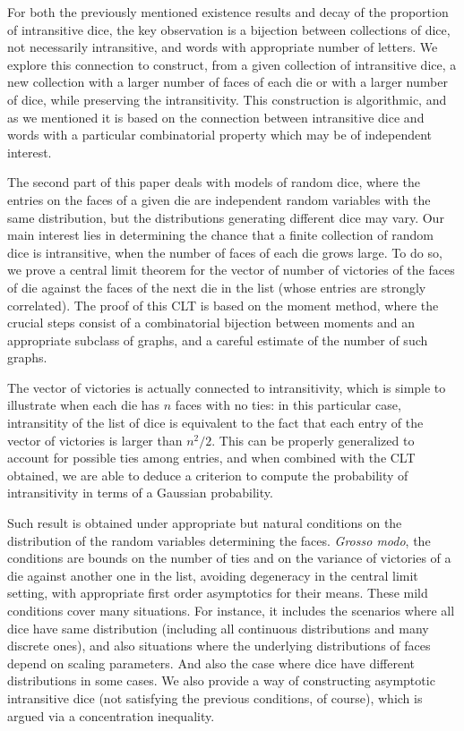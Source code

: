 \documentclass[reqno,a4paper,11pt]{amsart}
\theoremstyle{remark}
\numberwithin{equation}{section}
\begin{document}
For both the previously mentioned existence results and decay of the proportion of intransitive dice, the key observation is a bijection between collections of dice, not necessarily intransitive, and words with appropriate number of letters. We explore this connection to construct, from a given collection of intransitive dice, a new collection with a larger number of faces of each die or with a larger number of dice, while preserving the intransitivity. This construction is algorithmic, and as we mentioned it is based on the connection between intransitive dice and words with a particular combinatorial property which may be of independent interest.

The second part of this paper deals with models of random dice, where the entries on the faces of a given die are independent random variables with the same distribution, but the distributions generating different dice may vary. Our main interest lies in determining the chance that a finite collection of random dice is intransitive, when the number of faces of each die grows large. To do so, we prove a central limit theorem for the vector of number of victories of the faces of die against the faces of the next die in the list (whose entries are strongly correlated). The proof of this CLT  is based on the moment method, where the crucial steps consist of a combinatorial bijection between moments and an appropriate subclass of graphs, and a careful estimate of the number of such graphs. 

The vector of victories is actually connected to intransitivity, which is simple to illustrate when each die has $n$ faces with no ties: in this particular case, intransitity of the list of dice is  equivalent to the fact that each entry of the vector of victories is larger than $n^2/2$.
This can be properly generalized to account for possible ties among entries, and when combined with the CLT obtained, we are able to deduce a criterion to compute the probability of intransitivity in terms of a Gaussian probability.

Such result is obtained under appropriate but natural conditions on the distribution of the random variables determining the faces. \textit{Grosso modo}, the conditions are bounds on the number of ties and on the variance of victories of a die against another one in the list, avoiding degeneracy in the central limit setting, with appropriate first order asymptotics for their means.  These mild conditions cover many situations. For instance, it  includes the  scenarios where  all dice have same distribution (including all continuous distributions and many discrete ones), and also situations where the underlying distributions of faces depend on scaling parameters. And also the case where dice have different distributions in some cases. We also provide a way of constructing asymptotic intransitive dice (not satisfying the previous conditions, of course), which is argued via a concentration inequality.
\end{document}

